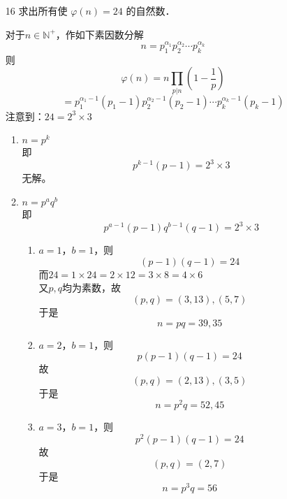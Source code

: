 \begin{enumerate}
\begin{proof}
\begin{enumerate}
            而
            \[\lfloor\frac{n}{2k}\rfloor=\lfloor\frac{\frac{n}{k}}{2}\rfloor=\frac{\frac{n}{k}-1}{2}\]
            因此，
            \[\sum\limits_{\substack{1\leq d\leq \lfloor \frac{n}{2} \rfloor\\k|d}}d=k\cdot\frac{\frac{\frac{n}{k}-1}{2}(\frac{\frac{n}{k}-1}{2}+1)}{2}\]
            \[=\frac{n^2-k^2}{8k}\]
            则
            \[S=\sum\limits_{k|n}\mu(k)\cdot\frac{n^2-k^2}{8k}\]
            \[=\frac{1}{8}\left(n^2\sum\limits_{k|n}\frac{\mu(k)}{k}-\sum\limits_{k|n}\mu(k)k\right)\]
            其中，
            \[\sum\limits_{k|n}\frac{\mu(k)}{k}=\frac{\varphi(n)}{n}\]
            \[\sum\limits_{k|n}\mu(k)k=\prod\limits_{p|n}(1-p)\]
            于是，
            \[S=\frac{1}{8}\left(n^2\cdot\frac{\varphi(n)}{n}-\prod\limits_{p|n}(1-p)\right)\]
            \[=\frac{1}{8}n\varphi(n)-\frac{1}{8}\prod\limits_{p|n}(1-p)\]
        \end{enumerate}
    \end{proof}
    \item[16] 求出所有使 $\varphi(n)=24$ 的自然数．
    \begin{solution}
      对于$n\in\mathbb{N}^+$，作如下素因数分解
      \[n=p_1^{\alpha_1}p_2^{\alpha_2}\cdots p_k^{\alpha_k}\]
      则
      \[\varphi(n)=n\prod\limits_{p|n}(1-\frac{1}{p})\]
      \[=p_1^{\alpha_1-1}(p_1-1)p_2^{\alpha_2-1}(p_2-1)\cdots p_k^{\alpha_k-1}(p_k-1)\]
      注意到：$24=2^3\times 3$
      \begin{enumerate}
        \item $n=p^k$\\
        即
        \[p^{k-1}(p-1)=2^3\times 3\]
        无解。
        \item $n=p^aq^b$\\
        即
        \[p^{a-1}(p-1)q^{b-1}(q-1)=2^3\times 3\]
        \begin{enumerate}
          \item $a=1$，$b=1$，则
          \[(p-1)(q-1)=24\]
          而$24=1\times 24=2\times 12=3\times 8=4\times 6$\\
          又$p,q$均为素数，故
          \[(p,q)=(3,13),(5,7)\]
          于是
          \[n=pq=39,35\]
          \item $a=2$，$b=1$，则
          \[p(p-1)(q-1)=24\]
          故
          \[(p,q)=(2,13),(3,5)\]
          于是
          \[n=p^2q=52,45\]
          \item $a=3$，$b=1$，则
          \[p^2(p-1)(q-1)=24\]
          故
          \[(p,q)=(2,7)\]
          于是
          \[n=p^3q=56\]

\end{enumerate}
\end{enumerate}
\end{solution}
\end{enumerate}
